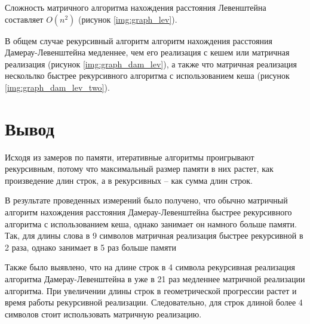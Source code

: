 \clearpage

Сложность матричного алгоритма нахождения расстояния Левенштейна составляет $O(n^2)$ (рисунок \ref{img:graph_lev}).

В общем случае рекурсивный алгоритм алгоритм нахождения расстояния Дамерау-Левенштейна медленнее, чем его реализация с кешем или матричная реализация (рисунок \ref{img:graph_dam_lev}), а также что матричная реализация нескольлко быстрее рекурсивного алгоритма с использованием кеша (рисунок \ref{img:graph_dam_lev_two}).


\section{Вывод}

Исходя из замеров по памяти, итеративные алгоритмы проигрывают рекурсивным, потому что максимальный размер памяти в них растет, как произведение длин строк, а в рекурсивных -- как сумма длин строк.

В результате проведенных измерений было получено, что обычно матричный алгоритм нахождения расстояния Дамерау-Левенштейна быстрее рекурсивного алгоритма с использованием кеша, однако занимает он намного больше памяти. Так, для длины слова в 9 символов матричная реализация быстрее рекурсивной в 2 раза, однако занимает в 5 раз больше памяти

Также было выявлено, что на длине строк в 4 символа рекурсивная реализация алгоритма Дамерау-Левенштейна в уже в 21 раз медленнее матричной реализации алгоритма. При увеличении длины строк в геометрической прогрессии растет и время работы рекурсивной реализации. Следовательно, для строк длиной более 4 символов стоит использовать матричную реализацию.
